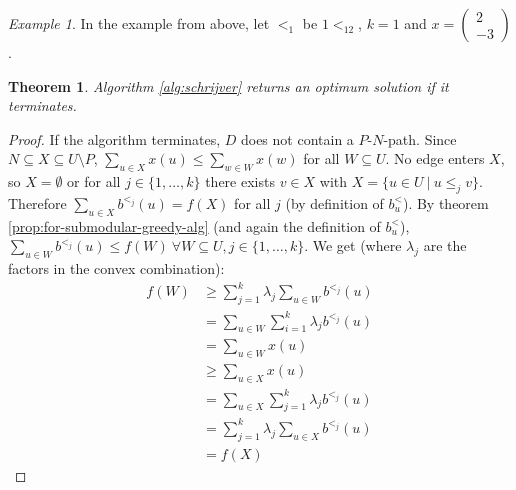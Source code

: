 \documentclass[11pt, a4paper]{article}
\newcommand{\set}[1]{\{#1\}}
\newtheorem{theorem}{Theorem}[section]
\theoremstyle{remark}
\newtheorem*{example}{Example}
\theoremstyle{definition}
\begin{document}
\begin{example}
	In the example from above, let $<_1$ be $1<_12$, $k=1$ and
	$x=\begin{pmatrix}2 \\ -3\end{pmatrix}$.
\end{example}

\begin{theorem}
	Algorithm \ref{alg:schrijver} returns an optimum solution if it terminates.
\end{theorem}
\begin{proof}
	If the algorithm terminates, $D$ does not contain a $P$-$N$-path. Since
	$N\subseteq X\subseteq U\setminus P$, $\sum_{u\in X}x(u)\leq \sum_{w\in W}
	x(w)$ for all $W\subseteq U$.
	No edge enters $X$, so $X=\emptyset$ or for all $j\in\set{1,\ldots,k}$
	there exists $v\in X$ with $X=\set{u\in U\ |\ u\leq_j v}$. Therefore
	$\sum_{u\in X}b^{<_j}(u)=f(X)$ for all $j$ (by definition of $b^<_u$).
	By theorem \ref{prop:for-submodular-greedy-alg} (and again the
	definition of $b^<_u$), $\sum_{u\in W}b^{<_j}(u)\leq f(W)\ \forall
	W\subseteq U, j\in\set{1,\ldots,k}$.  We get (where $\lambda_j$
	are the factors in the convex combination):
	\begin{align*}
		f(W)&\geq \sum_{j=1}^k\lambda_j \sum_{u\in W}b^{<_j}(u) \\
		&=\sum_{u\in W}\sum_{i=1}^k\lambda_j b^{<_j}(u) \\
		&=\sum_{u\in W}x(u) \\
		&\geq \sum_{u\in X}x(u) \\
		&=\sum_{u\in X}\sum_{j=1}^k\lambda_jb^{<_j}(u) \\
		&=\sum_{j=1}^k\lambda_j\sum_{u\in X}b^{<_j}(u) \\
		&=f(X)
	\end{align*}
\end{proof}
\end{document}
